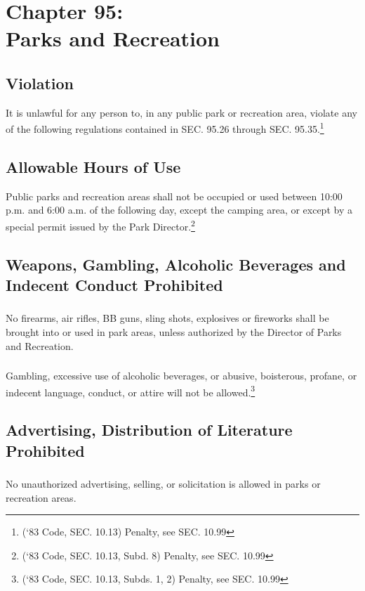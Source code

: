 \chapter*{Chapter 95: \\
	Parks and Recreation}
    \minitoc
    \pagebreak


\setcounter{section}{24}
\section{Violation}
It is unlawful for any person to, in any public park or recreation area, violate any of the following regulations contained in SEC. 95.26 through SEC. 95.35.\footnote{(‘83 Code, SEC. 10.13)  Penalty, see SEC. 10.99}
\section{Allowable Hours of Use}
Public parks and recreation areas shall not be occupied or used between 10:00 p.m. and 6:00 a.m. of the following day, except the camping area, or except by a special permit issued by the Park Director.\footnote{(‘83 Code, SEC. 10.13, Subd. 8) Penalty, see SEC. 10.99}
\section{Weapons, Gambling, Alcoholic Beverages and Indecent Conduct Prohibited}
\subsection{}
No firearms, air rifles, BB guns, sling shots, explosives or fireworks shall be brought into or used in park areas, unless authorized by the Director of Parks and Recreation.
\subsection{}
Gambling, excessive use of alcoholic beverages, or abusive, boisterous, profane, or indecent language, conduct, or attire will not be allowed.\footnote{(‘83 Code, SEC. 10.13, Subds. 1, 2)  Penalty, see SEC. 10.99}
\section{Advertising, Distribution of Literature Prohibited}
\subsection{}
No unauthorized advertising, selling, or solicitation is allowed in parks or recreation areas.

